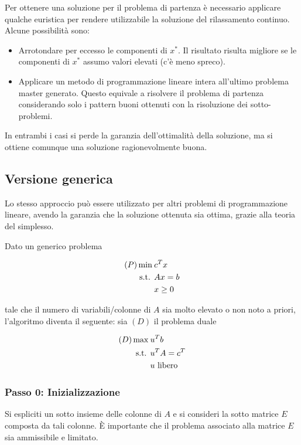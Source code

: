 Per ottenere una soluzione per il problema di partenza è necessario applicare qualche euristica per rendere utilizzabile la soluzione del rilassamento continuo.
Alcune possibilità sono:

\begin{itemize}
	\item Arrotondare per eccesso le componenti di $x^*$. Il risultato risulta migliore se le componenti di $x^*$ assumo valori elevati (c'è meno spreco).
	\item Applicare un metodo di programmazione lineare intera all'ultimo problema master generato. Questo equivale a risolvere il problema di partenza considerando solo i pattern buoni ottenuti con la risoluzione dei sotto-problemi.
\end{itemize}

In entrambi i casi si perde la garanzia dell'ottimalità della soluzione, ma si ottiene comunque una soluzione ragionevolmente buona.

\subsection{Versione generica}

Lo stesso approccio può essere utilizzato per altri problemi di programmazione lineare, avendo la garanzia che la soluzione ottenuta sia ottima, grazie alla teoria del simplesso.

Dato un generico problema

\begin{align*}
(P) \min \: & c^Tx \\
\text{s.t. }& Ax = b \\
&x\geq 0
\end{align*}

\noindent tale che il numero di variabili/colonne di $A$ sia molto elevato o non noto a priori, l'algoritmo diventa il seguente: sia $(D)$ il problema duale

\begin{align*}
(D) \max \: & u^Tb \\
\text{s.t. }& u^TA = c^T \\
&u \text{ libero}
\end{align*}

\subsubsection{Passo 0: Inizializzazione}

Si espliciti un sotto insieme delle colonne di $A$ e si consideri la sotto matrice $E$ composta da tali colonne. \`E importante che il problema associato alla matrice $E$ sia ammissibile e limitato.

